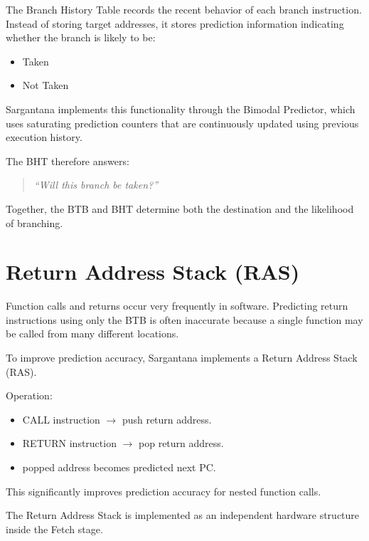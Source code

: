 The Branch History Table records the recent behavior of each branch instruction.
Instead of storing target addresses, it stores prediction information indicating whether the
branch is likely to be:
\begin{itemize}
  \item Taken
  \item Not Taken
\end{itemize}

Sargantana implements this functionality through the Bimodal Predictor, which uses saturating
prediction counters that are continuously updated using previous execution history.

The BHT therefore answers:

\begin{quote}
\textit{``Will this branch be taken?''}
\end{quote}

Together, the BTB and BHT determine both the destination and the likelihood of branching.

\begin{rtlrefs}
\end{rtlrefs}

\section{Return Address Stack (RAS)}

Function calls and returns occur very frequently in software.
Predicting return instructions using only the BTB is often inaccurate because a single function
may be called from many different locations.

To improve prediction accuracy, Sargantana implements a Return Address Stack (RAS).

Operation:
\begin{itemize}
  \item CALL instruction $\rightarrow$ push return address.
  \item RETURN instruction $\rightarrow$ pop return address.
  \item popped address becomes predicted next PC.
\end{itemize}

This significantly improves prediction accuracy for nested function calls.

The Return Address Stack is implemented as an independent hardware structure inside the
Fetch stage.

